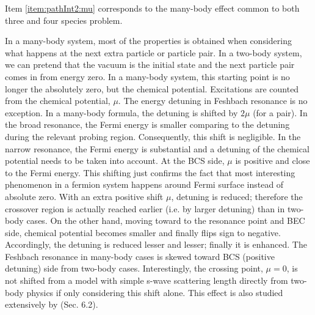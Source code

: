 Item \ref{item:pathInt2:mu} corresponds to the many-body effect  common to both three and four species problem.
\begin{unsure}
In a many-body system, most of the properties is obtained when considering what happens at the next extra particle or particle pair. In a two-body system,  we can pretend that the vacuum is the initial state and the next particle pair comes in from energy zero.  In a many-body system, this starting point is no longer the absolutely zero, but the chemical potential.  Excitations are counted from the chemical potential, $\mu$.  The energy detuning in Feshbach resonance is no exception.  In a many-body formula, the detuning is shifted by $2\mu$ (for a pair).  In the broad resonance, the Fermi energy is smaller comparing to the detuning during the relevant probing region.  Consequently, this shift is negligible.  In the narrow resonance, the Fermi energy is substantial and a detuning of the chemical potential needs to be taken into account.  At the BCS side, $\mu$ is positive and close to the Fermi energy. This shifting just confirms the fact that most interesting phenomenon in a fermion system happens around Fermi surface instead of absolute zero.  With an extra positive shift $\mu$, detuning is reduced; therefore the crossover region is actually reached earlier (i.e. by larger detuning) than in two-body cases.  On the other hand, moving toward to the resonance point and BEC side, chemical potential becomes smaller and finally flips sign to negative. Accordingly, the detuning is reduced lesser and lesser;  finally it is enhanced.  The Feshbach resonance in many-body cases is skewed toward BCS (positive detuning) side from two-body cases.  Interestingly, the crossing point, $\mu=0$, is not shifted from a model with simple  s-wave scattering length directly from two-body physics if only considering this shift alone.  This effect is also  studied extensively by \cite{GurarieNarrow}(Sec. 6.2). 
\end{unsure}



